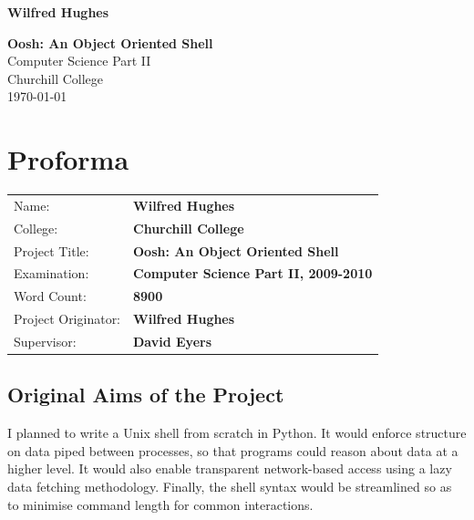 \documentclass[12pt,twoside,notitlepage]{report}
\begin{document}





\pagestyle{empty}

\hfill{\LARGE \bf Wilfred Hughes}

\vspace*{60mm}
\begin{center}
\Huge
{\bf Oosh: An Object Oriented Shell} \\
\vspace*{5mm}
Computer Science Part II \\
\vspace*{5mm}
Churchill College \\
\vspace*{5mm}
\today  %
\end{center}

\cleardoublepage


\setcounter{page}{1}
\pagestyle{plain}

\chapter*{Proforma}

{\large
\begin{tabular}{ll}
Name:               & \bf Wilfred Hughes                       \\
College:            & \bf Churchill College                     \\
Project Title:      & \bf Oosh: An Object Oriented Shell \\
Examination:        & \bf Computer Science Part II, 2009-2010        \\
Word Count:         & \bf 8900 \\
Project Originator: & \bf Wilfred Hughes                    \\
Supervisor:         & \bf David Eyers                    \\ 
\end{tabular}
}

\section*{Original Aims of the Project}

I planned to write a Unix shell from scratch in Python. It would
enforce structure on data piped between processes, so that programs
could reason about data at a higher level. It would also enable
transparent network-based access using a lazy data fetching
methodology. Finally, the shell syntax would be streamlined so as to
minimise command length for common interactions.
\end{document}
